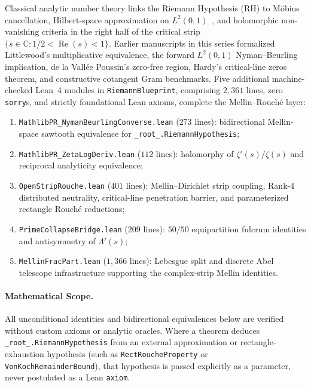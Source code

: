 \documentclass[11pt,a4paper]{article}
\theoremstyle{definition}
\newcommand{\Cfield}{\mathbb{C}}
\begin{document}
Classical analytic number theory links the Riemann Hypothesis (RH) to M\"obius cancellation, Hilbert-space approximation on $L^2(0,1)$~\cite{Nyman1950,Beurling1955,BaezDuarte2003}, and holomorphic non-vanishing criteria in the right half of the critical strip $\{s \in \Cfield : 1/2 < \operatorname{Re}(s) < 1\}$. Earlier manuscripts in this series formalized Littlewood's multiplicative equivalence, the forward $L^2(0,1)$ Nyman--Beurling implication, de la Vall\'ee Poussin's zero-free region, Hardy's critical-line zeros theorem, and constructive cotangent Gram benchmarks. Five additional machine-checked Lean~4 modules in \texttt{RiemannBlueprint}, comprising $2{,}361$ lines, zero \texttt{sorry}s, and strictly foundational Lean axioms, complete the Mellin--Rouch\'e layer:
\begin{enumerate}[label=(\roman*),noitemsep]
  \item \texttt{MathlibPR\_\allowbreak NymanBeurlingConverse.lean} ($273$ lines): bidirectional Mellin-space sawtooth equivalence for \texttt{\_root\_.\allowbreak RiemannHypothesis};
  \item \texttt{MathlibPR\_\allowbreak ZetaLogDeriv.lean} ($112$ lines): holomorphy of $\zeta'(s)/\zeta(s)$ and reciprocal analyticity equivalence;
  \item \texttt{OpenStripRouche.lean} ($401$ lines): Mellin--Dirichlet strip coupling, Rank-4 distributed neutrality, critical-line penetration barrier, and parameterized rectangle Rouch\'e reductions;
  \item \texttt{PrimeCollapseBridge.lean} ($209$ lines): $50/50$ equipartition fulcrum identities and antisymmetry of $\Lambda'(s)$;
  \item \texttt{MellinFracPart.lean} ($1{,}366$ lines): Lebesgue split and discrete Abel telescope infrastructure supporting the complex-strip Mellin identities.
\end{enumerate}

\paragraph{Mathematical Scope.}
All unconditional identities and bidirectional equivalences below are verified without custom axioms or analytic oracles. Where a theorem deduces \texttt{\_root\_.\allowbreak RiemannHypothesis} from an external approximation or rectangle-exhaustion hypothesis (such as \texttt{RectRoucheProperty} or \texttt{VonKochRemainderBound}), that hypothesis is passed explicitly as a parameter, never postulated as a Lean \texttt{axiom}.
\end{document}
